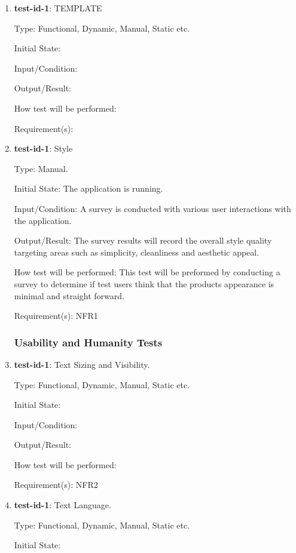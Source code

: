 \documentclass[12pt, titlepage]{article}
\begin{document}
	
	\begin{enumerate}
		
		\item{\textbf{test-id-1}}: TEMPLATE
		
		Type: Functional, Dynamic, Manual, Static etc.
		
		Initial State: 
		
		Input/Condition: 
		
		Output/Result: 
		
		How test will be performed: 
		
		Requirement(s):
			
		\item{\textbf{test-id-1}}: Style

		Type: Manual.
		
		Initial State: The application is running.
		
		Input/Condition: A survey is conducted with various user interactions with the application. 
		
		Output/Result: The survey results will record the overall style quality targeting areas such as simplicity, cleanliness and aesthetic appeal. 
		
		How test will be performed: This test will be preformed by conducting a survey to determine if test users think that the products appearance is minimal and straight forward.
		
		Requirement(s): NFR1
		
		

	
	\subsubsection{Usability and Humanity Tests}
		\item{\textbf{test-id-1}}: Text Sizing and Visibility.
		
		Type: Functional, Dynamic, Manual, Static etc.
		
		Initial State: 
		
		Input/Condition: 
		
		Output/Result: 
		
		How test will be performed: 
		
		Requirement(s): NFR2
		
		\item{\textbf{test-id-1}}: Text Language.
		
		Type: Functional, Dynamic, Manual, Static etc.
		
		Initial State: 
		

\end{enumerate}
\end{document}
